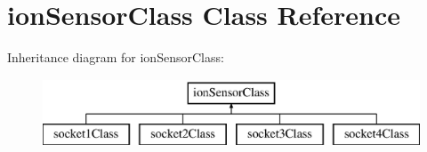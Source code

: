 \hypertarget{classion_sensor_class}{}\section{ion\+Sensor\+Class Class Reference}
\label{classion_sensor_class}
Inheritance diagram for ion\+Sensor\+Class\+:\begin{figure}[H]
\begin{center}
\leavevmode
\includegraphics[height=2.000000cm]{classion_sensor_class}
\end{center}
\end{figure}
